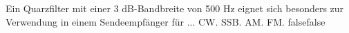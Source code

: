     {Ein Quarzfilter mit einer 3 dB-Bandbreite von 500 Hz eignet sich besonders zur Verwendung in einem Sendeempfänger für ...}
    {CW.}
    {SSB.}
    {AM.}
    {FM.}
    {false}{false}